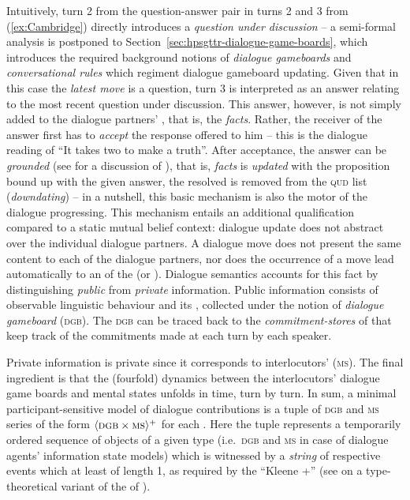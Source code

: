 \documentclass[output=paper
	        ,collection
	        ,collectionchapter
 	        ,biblatex
                ,babelshorthands
                ,newtxmath
                ,draftmode
                ,colorlinks, citecolor=brown
]{langscibook}
\begin{document}
Intuitively, turn 2 from the question-answer pair in turns 2 and 3 from (\ref{ex:Cambridge}) directly introduces a \emph{question under discussion} -- a semi-formal analysis is postponed to Section~\ref{sec:hpsgttr-dialogue-game-boards}, which introduces the required background notions of \emph{dialogue gameboards} and \emph{conversational rules} which regiment dialogue gameboard updating.
%
Given that in this case the \emph{latest move} is a question, turn 3 is interpreted as an answer relating to the most recent question under discussion.
%
This answer, however, is not simply added to the dialogue partners' , that is, the \emph{facts}.
%
Rather, the receiver of the answer first has to \emph{accept}  the response offered to him -- this is the dialogue reading of \enquote{It takes two to make a truth}.
%
After acceptance, the answer can be \emph{grounded}  (see \citealt[Chapter 4]{Clark:1996} for a discussion of ), that is, \emph{facts} is \emph{updated}  with the proposition bound up with the given answer, the resolved  is removed from the \textsc{qud} list (\emph{downdating})  -- in a nutshell, this basic mechanism is also the motor of the dialogue progressing. 
%
This mechanism entails an additional qualification compared to a static mutual belief context: dialogue update does not abstract over the individual dialogue partners.
%
A dialogue move does not present the same content to each of the dialogue partners, nor does the occurrence of a move lead automatically to an  of the  (or ).
%
Dialogue semantics accounts for this fact by distinguishing \emph{public}  from \emph{private} information.  
%
Public information consists of observable linguistic behaviour and its , collected under the notion of \emph{dialogue gameboard} (\textsc{dgb}). 
%
The \textsc{dgb} can be traced back to the \emph{commitment-stores}  of \citet{Hamblin:1970} that keep track of the commitments made at each turn by each speaker. 

Private information is private since it corresponds to interlocutors'  (\textsc{ms}).
%
The final ingredient is that the (fourfold) dynamics between the interlocutors' dialogue game boards and mental states unfolds in time, turn by turn.
%
In sum, a minimal participant-sensitive model of dialogue contributions is a tuple of \textsc{dgb} and \textsc{ms} series of the form $\langle \textsc{dgb} \times \textsc{ms} \rangle^+$ for each . 
%
Here the tuple represents a temporarily ordered sequence of objects of a given type (i.e.\ \textsc{dgb} and \textsc{ms} in case of dialogue agents' information state models)  which is witnessed by a \emph{string}  of respective events which at least of length 1, as required by the \enquote{Kleene +} \is{+}  (see \citealt[Section 2.7]{Cooper:Ginzburg:2015} on a type-theoretical variant of the  of \citealt{Fernando:2011}).
\end{document}
